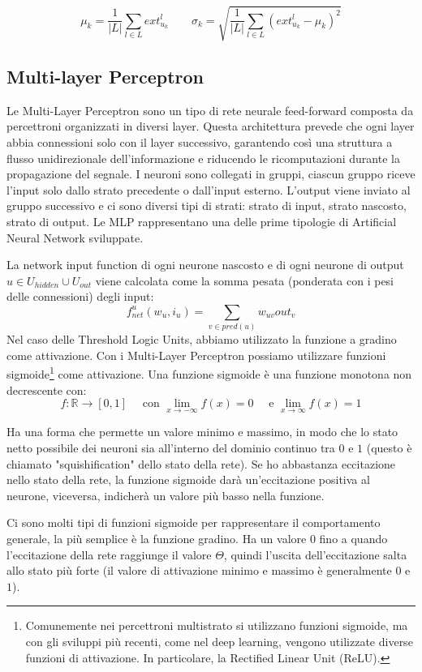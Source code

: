 $$
\mu_k = \frac{1}{|L|}\sum_{l \in L} ext^l_{u_k} \quad \quad \sigma_k = \sqrt{\frac{1}{|L|}\sum_{l \in L} (ext^l_{u_k} - \mu_k)^2}
$$

\subsection{Multi-layer Perceptron}
Le Multi-Layer Perceptron sono un tipo di rete neurale feed-forward composta da percettroni organizzati in diversi layer. Questa architettura prevede che ogni layer abbia connessioni solo con il layer successivo, garantendo così una struttura a flusso unidirezionale dell'informazione e riducendo le ricomputazioni durante la propagazione del segnale. I neuroni sono collegati in gruppi, ciascun gruppo riceve l'input solo dallo strato precedente o dall'input esterno. L'output viene inviato al gruppo successivo e ci sono diversi tipi di strati: strato di input, strato nascosto, strato di output. Le MLP rappresentano una delle prime tipologie di Artificial Neural Network sviluppate.

La network input function di ogni neurone nascosto e di ogni neurone di output $u \in U_{hidden} \cup U_{out}$ viene calcolata come la somma pesata (ponderata con i pesi delle connessioni) degli input:
$$
f^u_{net}(w_u,i_u) = \sum_{v \in pred(u)} w_{uv}out_v
$$
Nel caso delle Threshold Logic Units, abbiamo utilizzato la funzione a gradino come attivazione. Con i Multi-Layer Perceptron possiamo utilizzare funzioni sigmoide\footnote{Comunemente nei percettroni multistrato si utilizzano funzioni sigmoide, ma con gli sviluppi più recenti, come nel deep learning, vengono utilizzate diverse funzioni di attivazione. In particolare, la Rectified Linear Unit (ReLU).} come attivazione. Una {funzione sigmoide} è una funzione monotona non decrescente con:
$$
f: \mathbb{R} \to [0,1] \quad \text{ con } \lim_{x\to-\infty}f(x) = 0 \quad \text{ e } \lim_{x\to\infty}f(x) = 1
$$

Ha una forma che permette un valore minimo e massimo, in modo che lo stato netto possibile dei neuroni sia all'interno del dominio continuo tra $0$ e $1$ (questo è chiamato "squishification" dello stato della rete). Se ho abbastanza eccitazione nello stato della rete, la funzione sigmoide darà un'eccitazione positiva al neurone, viceversa, indicherà un valore più basso nella funzione. 

Ci sono molti tipi di funzioni sigmoide per rappresentare il comportamento generale, la più semplice è la funzione gradino. Ha un valore $0$ fino a quando l'eccitazione della rete raggiunge il valore $\Theta$, quindi l'uscita dell'eccitazione salta allo stato più forte (il valore di attivazione minimo e massimo è generalmente $0$ e $1$).

